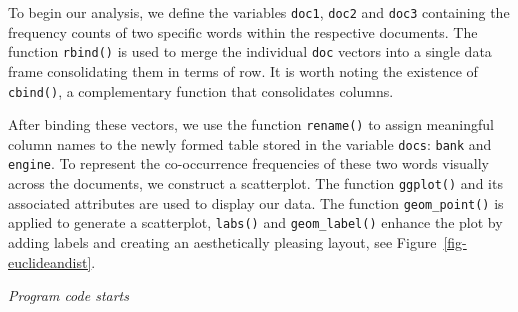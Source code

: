 To begin our analysis, we define the variables \texttt{doc1},
\texttt{doc2} and \texttt{doc3} containing the frequency counts of two
specific words within the respective documents. The function
\texttt{rbind()} is used to merge the individual \texttt{doc} vectors
into a single data frame consolidating them in terms of row. It is worth noting
the existence of \texttt{cbind()}, a complementary function that
consolidates columns.

After binding these vectors, we use the function \texttt{rename()}
to assign meaningful column names to the newly formed table stored in the variable \texttt{docs}: \texttt{bank} and \texttt{engine}. To represent the co-occurrence frequencies of these two words visually across the documents, we construct a
scatterplot. The function \texttt{ggplot()} and its associated
attributes are used to display our data. The function
\texttt{geom\_point()} is applied to generate a scatterplot,
\texttt{labs()} and \texttt{geom\_label()} enhance the plot by adding labels
and creating an aesthetically pleasing layout, see
Figure~\ref{fig-euclideandist}.

\emph{Program code starts}

\begin{Shaded}
\begin{Highlighting}[]
\OtherTok{\textless{}{-}} \NormalTok{(}\NormalTok{, }\NormalTok{)}
\OtherTok{\textless{}{-}} \NormalTok{(}\NormalTok{, }\NormalTok{)}
\OtherTok{\textless{}{-}} \NormalTok{(}\NormalTok{, }\NormalTok{)}

\OtherTok{\textless{}{-}} \SpecialCharTok{\%\textgreater{}\%}
\SpecialCharTok{\%\textgreater{}\%}
  \NormalTok{(}\NormalTok{, }\NormalTok{)}
  
\NormalTok{(}\SpecialCharTok{+} 
  \NormalTok{() }\SpecialCharTok{+} 
  \NormalTok{(}\NormalTok{, }\NormalTok{) }\SpecialCharTok{+} 
  \NormalTok{(} \NormalTok{, } \NormalTok{)}
\end{Highlighting}
\end{Shaded}

